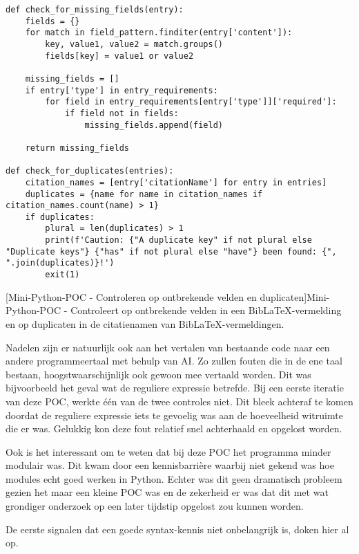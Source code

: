 \begin{verbatim}
def check_for_missing_fields(entry):
    fields = {}
    for match in field_pattern.finditer(entry['content']):
        key, value1, value2 = match.groups()
        fields[key] = value1 or value2

    missing_fields = []
    if entry['type'] in entry_requirements:
        for field in entry_requirements[entry['type']]['required']:
            if field not in fields:
                missing_fields.append(field)

    return missing_fields

def check_for_duplicates(entries):
    citation_names = [entry['citationName'] for entry in entries]
    duplicates = {name for name in citation_names if citation_names.count(name) > 1}
    if duplicates:
        plural = len(duplicates) > 1
        print(f'Caution: {"A duplicate key" if not plural else "Duplicate keys"} {"has" if not plural else "have"} been found: {", ".join(duplicates)}!')
        exit(1)
\end{verbatim}
[Mini-Python-\acrshort{POC} - Controleren op ontbrekende velden en duplicaten]{Mini-Python-\acrshort{POC} - Controleert op ontbrekende velden in een BibLaTeX-vermelding en op duplicaten in de citatienamen van BibLaTeX-vermeldingen. \label{lst:mini_python_poc_check_functions}}

Nadelen zijn er natuurlijk ook aan het vertalen van bestaande code naar een andere programmeertaal met behulp van \acrshort{AI}. Zo zullen fouten die in de ene taal bestaan, hoogstwaarschijnlijk ook gewoon mee vertaald worden. Dit was bijvoorbeeld het geval wat de reguliere expressie betrefde. Bij een eerste iteratie van deze \acrfull{POC}, werkte één van de twee controles niet. Dit bleek achteraf te komen doordat de reguliere expressie iets te gevoelig was aan de hoeveelheid witruimte die er was. Gelukkig kon deze fout relatief snel achterhaald en opgelost worden.

Ook is het interessant om te weten dat bij deze \acrfull{POC} het programma minder modulair was. Dit kwam door een kennisbarrière waarbij niet gekend was hoe modules echt goed werken in Python. Echter was dit geen dramatisch probleem gezien het maar een kleine \acrshort{POC} was en de zekerheid er was dat dit met wat grondiger onderzoek op een later tijdstip opgelost zou kunnen worden.

De eerste signalen dat een goede syntax-kennis niet onbelangrijk is, doken hier al op.

